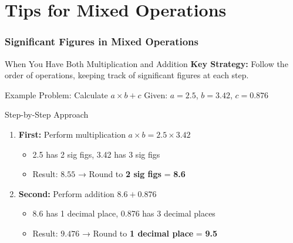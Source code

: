 \documentclass{beamer}
\begin{document}
\section{Tips for Mixed Operations}
\begin{frame}
    \frametitle{Significant Figures in Mixed Operations}
    \begin{block}{When You Have Both Multiplication and Addition}
        \textbf{Key Strategy:} Follow the order of operations, keeping track of significant figures at each step.
    \end{block}
    \pause
    \begin{exampleblock}{Example Problem: Calculate \(a \times b + c\)}
        Given: \(a = 2.5\), \(b = 3.42\), \(c = 0.876\)
    \end{exampleblock}
    \pause
    \begin{block}{Step-by-Step Approach}
        \begin{enumerate}
            \item \textbf{First:} Perform multiplication \(a \times b = 2.5 \times 3.42\)
            \begin{itemize}
                \item 2.5 has 2 sig figs, 3.42 has 3 sig figs
                \item Result: \(8.55\) → Round to \textbf{2 sig figs} = \textbf{8.6}
            \end{itemize}
            \pause
            \item \textbf{Second:} Perform addition \(8.6 + 0.876\)
            \begin{itemize}
                \item 8.6 has 1 decimal place, 0.876 has 3 decimal places
                \item Result: \(9.476\) → Round to \textbf{1 decimal place} = \textbf{9.5}
            \end{itemize}
        \end{enumerate}
    \end{block}
\end{frame}
\end{document}
